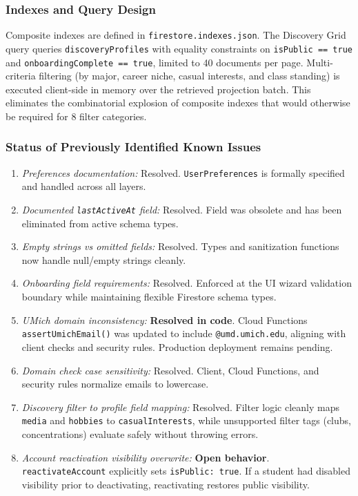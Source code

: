 \documentclass[11pt,letterpaper]{article}
\begin{document}
\subsubsection*{Indexes and Query Design}
Composite indexes are defined in \texttt{firestore.indexes.json}. The Discovery Grid query queries \texttt{discoveryProfiles} with equality constraints on \texttt{isPublic == true} and \texttt{onboardingComplete == true}, limited to 40 documents per page. Multi-criteria filtering (by major, career niche, casual interests, and class standing) is executed client-side in memory over the retrieved projection batch. This eliminates the combinatorial explosion of composite indexes that would otherwise be required for 8 filter categories.

\subsubsection*{Status of Previously Identified Known Issues}
\begin{enumerate}[leftmargin=*,noitemsep]
\item \textit{Preferences documentation:} Resolved. \texttt{UserPreferences} is formally specified and handled across all layers.
\item \textit{Documented \texttt{lastActiveAt} field:} Resolved. Field was obsolete and has been eliminated from active schema types.
\item \textit{Empty strings vs omitted fields:} Resolved. Types and sanitization functions now handle null/empty strings cleanly.
\item \textit{Onboarding field requirements:} Resolved. Enforced at the UI wizard validation boundary while maintaining flexible Firestore schema types.
\item \textit{UMich domain inconsistency:} \textbf{Resolved in code}. Cloud Functions \texttt{assertUmichEmail()} was updated to include \texttt{@umd.umich.edu}, aligning with client checks and security rules. Production deployment remains pending.
\item \textit{Domain check case sensitivity:} Resolved. Client, Cloud Functions, and security rules normalize emails to lowercase.
\item \textit{Discovery filter to profile field mapping:} Resolved. Filter logic cleanly maps \texttt{media} and \texttt{hobbies} to \texttt{casualInterests}, while unsupported filter tags (clubs, concentrations) evaluate safely without throwing errors.
\item \textit{Account reactivation visibility overwrite:} \textbf{Open behavior}. \texttt{reactivateAccount} explicitly sets \texttt{isPublic: true}. If a student had disabled visibility prior to deactivating, reactivating restores public visibility.
\end{enumerate}
\end{document}
